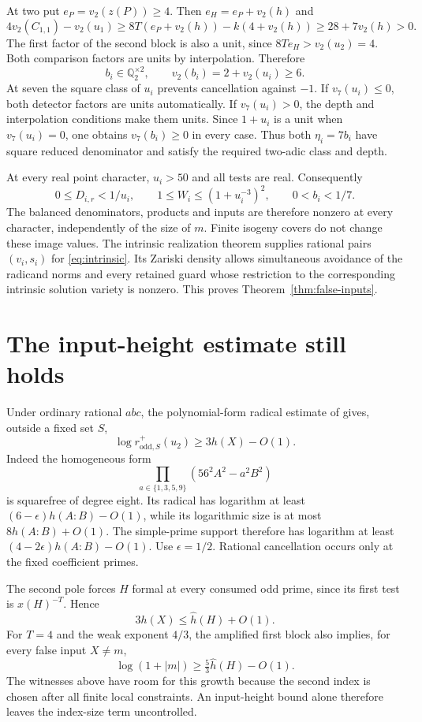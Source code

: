 \documentclass[11pt,a4paper]{article}
\newcommand{\Q}{\mathbb Q}\newcommand{\Z}{\mathbb Z}
\begin{document}
At two put $e_P=v_2(z(P))\ge4$. Then
$e_H=e_P+v_2(h)$ and
\[
 4v_2(C_{1,1})-v_2(u_1)
   \ge8T(e_P+v_2(h))-k(4+v_2(h))
   \ge28+7v_2(h)>0.
\]
The first factor of the second block is also a unit, since
$8Te_H>v_2(u_2)=4$. Both comparison factors are units by
interpolation. Therefore
\[
 b_i\in\Q_2^{\times2},\qquad
                     v_2(b_i)=2+v_2(u_i)\ge6.
\]
At seven the square class of $u_i$ prevents cancellation
against $-1$. If $v_7(u_i)\le0$, both detector factors are
units automatically. If $v_7(u_i)>0$, the depth and interpolation
conditions make them units. Since $1+u_i$ is a unit when
$v_7(u_i)=0$, one obtains $v_7(b_i)\ge0$ in every case.
Thus both $\eta_i=7b_i$ have square reduced denominator and
satisfy the required two-adic class and depth.

At every real point character, $u_i>50$ and all tests are real.
Consequently
\[
 0\le D_{i,r}<1/u_i,\qquad
 1\le W_i\le(1+u_i^{-3})^2,\qquad
                  0<b_i<1/7.
\]
The balanced denominators, products and inputs are therefore
nonzero at every character, independently of the size of $m$.
Finite isogeny covers do not change these image values. The
intrinsic realization theorem \cite{Intrinsic} supplies rational
pairs $(v_i,s_i)$ for \eqref{eq:intrinsic}. Its Zariski density
allows simultaneous avoidance of the radicand norms and every
retained guard whose restriction to the corresponding intrinsic
solution variety is nonzero. This proves
Theorem~\ref{thm:false-inputs}.

\section{The input-height estimate still holds}

Under ordinary rational $abc$, the polynomial-form radical
estimate of \cite{Derivative} gives, outside a fixed set $S$,
\[
 \log r^+_{\mathrm{odd},S}(u_2)\ge3h(X)-O(1).
\]
Indeed the homogeneous form
\[
           \prod_{a\in\{1,3,5,9\}}(56^2A^2-a^2B^2)
\]
is squarefree of degree eight. Its radical has logarithm at
least $(6-\epsilon)h(A:B)-O(1)$, while its logarithmic size
is at most $8h(A:B)+O(1)$. The simple-prime support therefore
has logarithm at least $(4-2\epsilon)h(A:B)-O(1)$.
Use $\epsilon=1/2$. Rational cancellation occurs only at the
fixed coefficient primes.

The second pole forces $H$ formal at every consumed odd prime,
since its first test is $x(H)^{-T}$. Hence
\[
                          3h(X)\le\widehat h(H)+O(1).
\]
For $T=4$ and the weak exponent $4/3$, the amplified first
block also implies, for every false input $X\ne m$,
\[
              \log(1+|m|)\ge\tfrac53\widehat h(H)-O(1).
\]
The witnesses above have room for this growth because the
second index is chosen after all finite local constraints.
An input-height bound alone therefore leaves the index-size
term uncontrolled.
\end{document}
